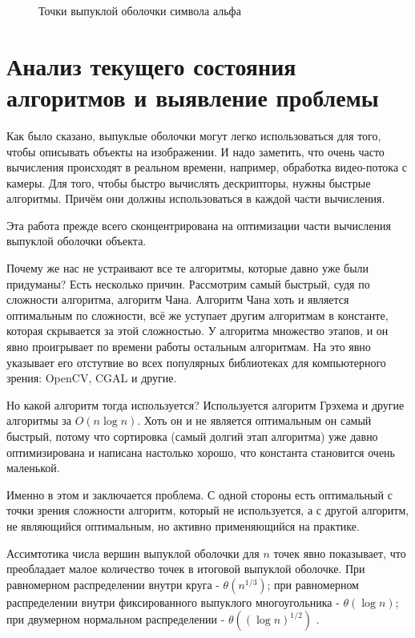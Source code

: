 \begin{figure}[H]
	\centering
	
	\caption{Точки выпуклой оболочки символа альфа}
	\label{img:alpha_convex_hull}
\end{figure}

\section{Анализ текущего состояния алгоритмов и выявление проблемы} \label{sect1_2}

Как было сказано, выпуклые оболочки могут легко использоваться для того, чтобы описывать объекты на изображении. И надо заметить, что очень часто вычисления происходят в реальном времени, например, обработка видео-потока с камеры. Для того, чтобы быстро вычислять дескрипторы, нужны быстрые алгоритмы. Причём они должны использоваться в каждой части вычисления.

Эта работа прежде всего сконцентрирована на оптимизации части вычисления выпуклой оболочки объекта.

Почему же нас не устраивают все те алгоритмы, которые давно уже были придуманы? Есть несколько причин. Рассмотрим самый быстрый, судя по сложности алгоритма, алгоритм Чана. Алгоритм Чана хоть и является оптимальным по сложности, всё же уступает другим алгоритмам в константе, которая скрывается за этой сложностью. У алгоритма множество этапов, и он явно проигрывает по времени работы остальным алгоритмам. На это явно указывает его отстутвие во всех популярных библиотеках для компьютерного зрения: OpenCV\cite{opencvconvexhull}, CGAL\cite{cgalconvexhull} и другие.

Но какой алгоритм тогда используется? Используется алгоритм Грэхема и другие алгоритмы за $O(n \log n)$. Хоть он и не является оптимальным он самый быстрый, потому что сортировка (самый долгий этап алгоритма) уже давно оптимизирована и написана настолько хорошо, что константа становится очень маленькой.

Именно в этом и заключается проблема. С одной стороны есть оптимальный с точки зрения сложности алгоритм, который не используется, а с другой алгоритм, не являющийся оптимальным, но активно применяющийся на практике.

Ассимтотика числа вершин выпуклой оболочки для $n$ точек явно показывает, что преобладает малое количество точек в итоговой выпуклой оболочке. При равномерном распределении внутри круга - $\theta(n^{1/3})$; при равномерном распределении внутри фиксированного выпуклого многоугольника - $\theta(\log n)$; при двумерном нормальном распределении - $\theta((\log n)^{1/2})$ \cite{algolist2010convexhull}.

